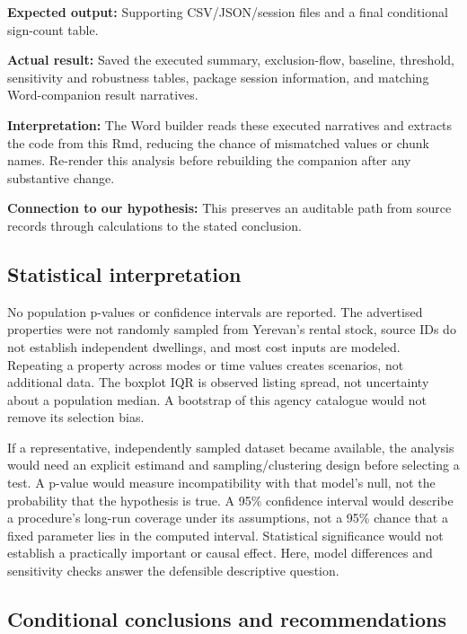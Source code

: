 \documentclass[
]{article}
\begin{document}
\textbf{Expected output:} Supporting CSV/JSON/session files and a final
conditional sign-count table.

\textbf{Actual result:} Saved the executed summary, exclusion-flow,
baseline, threshold, sensitivity and robustness tables, package session
information, and matching Word-companion result narratives.

\textbf{Interpretation:} The Word builder reads these executed
narratives and extracts the code from this Rmd, reducing the chance of
mismatched values or chunk names. Re-render this analysis before
rebuilding the companion after any substantive change.

\textbf{Connection to our hypothesis:} This preserves an auditable path
from source records through calculations to the stated conclusion.

\subsection{Statistical
interpretation}\label{statistical-interpretation}

No population p-values or confidence intervals are reported. The
advertised properties were not randomly sampled from Yerevan's rental
stock, source IDs do not establish independent dwellings, and most cost
inputs are modeled. Repeating a property across modes or time values
creates scenarios, not additional data. The boxplot IQR is observed
listing spread, not uncertainty about a population median. A bootstrap
of this agency catalogue would not remove its selection bias.

If a representative, independently sampled dataset became available, the
analysis would need an explicit estimand and sampling/clustering design
before selecting a test. A p-value would measure incompatibility with
that model's null, not the probability that the hypothesis is true. A
95\% confidence interval would describe a procedure's long-run coverage
under its assumptions, not a 95\% chance that a fixed parameter lies in
the computed interval. Statistical significance would not establish a
practically important or causal effect. Here, model differences and
sensitivity checks answer the defensible descriptive question.

\subsection{Conditional conclusions and
recommendations}\label{conditional-conclusions-and-recommendations}
\end{document}
